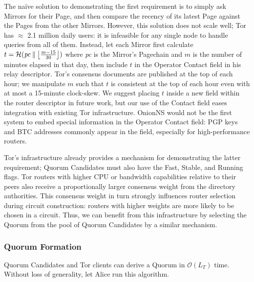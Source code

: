 \documentclass[conference]{IEEEtran}
\DeclarePairedDelimiter{\floor}{\lfloor}{\rfloor}
\newcommand*\concat{\mathbin{\|}}
\begin{document}
The na\"{i}ve solution to demonstrating the first requirement is to simply ask Mirrors for their Page, and then compare the recency of its latest Page against the Pages from the other Mirrors. However, this solution does not scale well; Tor has $ \approx $ 2.1 million daily users\cite{TorMetrics}: it is infeasible for any single node to handle queries from all of them. Instead, let each Mirror first calculate $ t = \mathcal{H}(\mathit{pc} \concat \floor[\big]{\frac{m - 15}{30}}) $ where \emph{pc} is the Mirror's Pagechain and $ m $ is the number of minutes elapsed in that day, then include $ t $ in the Operator Contact field in his relay descriptor. Tor's consensus documents are published at the top of each hour; we manipulate $ m $ such that $ t $ is consistent at the top of each hour even with at most a 15-minute clock-skew. We suggest placing $ t $ inside a new field within the router descriptor in future work, but our use of the Contact field eases integration with existing Tor infrastructure. OnionNS would not be the first system to embed special information in the Operator Contact field: PGP keys and BTC addresses commonly appear in the field, especially for high-performance routers.

Tor's infrastructure already provides a mechanism for demonstrating the latter requirement; Quorum Candidates must also have the Fast, Stable, and Running flags. Tor routers with higher CPU or bandwidth capabilities relative to their peers also receive a proportionally larger consensus weight from the directory authorities. This consensus weight in turn strongly influences router selection during circuit construction: routers with higher weights are more likely to be chosen in a circuit. Thus, we can benefit from this infrastructure by selecting the Quorum from the pool of Quorum Candidates by a similar mechanism.


\subsubsection{Quorum Formation}
\label{sec:qFormation}

Quorum Candidates and Tor clients can derive a Quorum in $ \mathcal{O}(L_{T}) $ time. Without loss of generality, let Alice run this algorithm.
\end{document}
